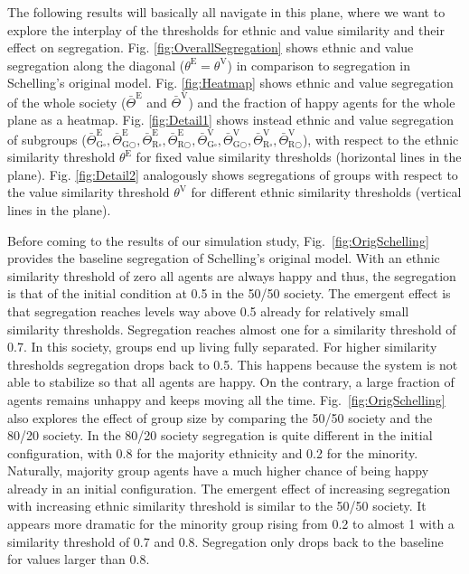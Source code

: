 \documentclass{ws-acs}
\begin{document}
The following results will basically all navigate in this plane, where we want to explore the interplay of the thresholds for ethnic and value similarity and their effect on segregation. Fig. \ref{fig:OverallSegregation} shows ethnic and value segregation along the diagonal ($\theta^\text{E} = \theta^\text{V}$) in comparison to segregation in Schelling's original model. Fig. \ref{fig:Heatmap} shows ethnic and value segregation of the whole society ($\bar\Theta^\text{E}$ and $\bar\Theta^\text{V}$) and the fraction of happy agents for the whole plane as a heatmap. Fig. \ref{fig:Detail1} shows instead ethnic and value segregation of subgroups ($\bar\Theta^\text{E}_{\text{G}\square}, \bar\Theta^\text{E}_{\text{G}\bigcirc}, \bar\Theta^\text{E}_{\text{R}\square}, \bar\Theta^\text{E}_{\text{R}\bigcirc}, \bar\Theta^\text{V}_{\text{G}\square}, \bar\Theta^\text{V}_{\text{G}\bigcirc}, \bar\Theta^\text{V}_{\text{R}\square}, \bar\Theta^\text{V}_{\text{R}\bigcirc}$), with respect to the ethnic similarity threshold $\theta^\text{E}$ for fixed value similarity thresholds (horizontal lines in the plane). Fig. \ref{fig:Detail2} analogously shows segregations of groups with respect to the value similarity threshold $\theta^\text{V}$ for different ethnic similarity thresholds (vertical lines in the plane). 

Before coming to the results of our simulation study, Fig.~\ref{fig:OrigSchelling} provides the baseline segregation of Schelling's original model. With an ethnic similarity threshold of zero all agents are always happy and thus, the segregation is that of the initial condition at 0.5 in the 50/50 society. The emergent effect is that segregation reaches levels way above 0.5 already for relatively small similarity thresholds. Segregation reaches almost one for a similarity threshold of 0.7. In this society, groups end up living fully separated. For higher similarity thresholds segregation drops back to 0.5. This happens because the system is not able to stabilize so that all agents are happy. On the contrary, a large fraction of agents remains unhappy and keeps moving all the time. Fig.~\ref{fig:OrigSchelling} also explores the effect of group size by comparing the 50/50 society and the 80/20 society. In the 80/20 society segregation is quite different in the initial configuration, with 0.8 for the majority ethnicity and 0.2 for the minority. Naturally, majority group agents have a much higher chance of being happy already in an initial configuration. The emergent effect of increasing segregation with increasing ethnic similarity threshold is similar to the 50/50 society. It appears more dramatic for the minority group rising from 0.2 to almost 1 with a similarity threshold of 0.7 and 0.8. Segregation only drops back to the baseline for values larger than 0.8. 
\end{document}
